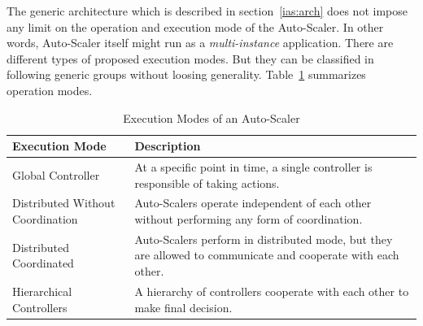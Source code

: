 The generic architecture which is described in section~\ref{ias:arch} does not impose any limit on the operation and execution mode of the Auto-Scaler. In other words, Auto-Scaler itself might run as a \emph{multi-instance} application. There are different types of proposed execution modes. But they can be classified in following generic groups without loosing generality. Table~\ref{tab:exec-mode} summarizes operation modes. 
\begin{table}[h]
    \begin{tabularx}{\textwidth}{lX}
        \toprule
        \textbf{Execution Mode} & \textbf{Description}\\
        \midrule
        Global Controller & At a specific point in time, a single controller is responsible of taking actions.\\
        Distributed Without Coordination & Auto-Scalers operate independent of each other without performing any form of coordination.\\
        Distributed Coordinated & Auto-Scalers perform in distributed mode, but they are allowed to communicate and cooperate with each other.\\
        Hierarchical Controllers & A hierarchy of controllers cooperate with each other to make final decision.\\
        \bottomrule
    \end{tabularx}
    \centering
    \caption{Execution Modes of an Auto-Scaler}
    \label{tab:exec-mode}
\end{table}
\clearpage
